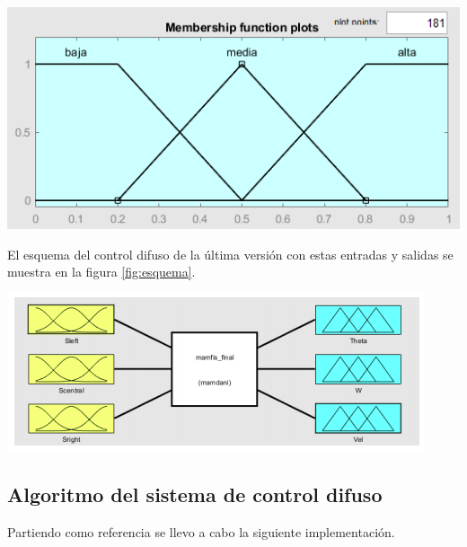 \begin{center}
    \includegraphics[scale=0.7]{Tesis/Capitulos/04_CAPITULO_2/img/varfuzzy5.png}
\end{center}

El esquema del control difuso de la última versión con estas entradas y salidas se muestra en la figura \ref{fig:esquema}.

\begin{center}
    \includegraphics[scale=0.5]{Tesis/Capitulos/04_CAPITULO_2/img/varfuzzy4.png}
    \label{fig:esquema}
\end{center}

\subsection{Algoritmo del sistema de control difuso}

Partiendo como referencia  se llevo a cabo la siguiente implementación.
\bigbreak

